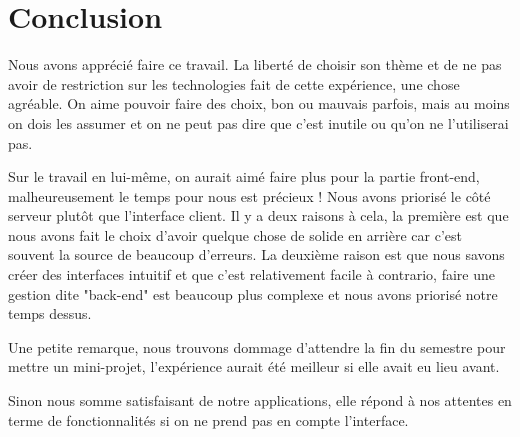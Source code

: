 
\section*{Conclusion}
Nous avons apprécié faire ce travail. La liberté de choisir son thème et de ne pas avoir de restriction sur les technologies fait de cette expérience, une chose agréable. On aime pouvoir faire des choix, bon ou mauvais parfois, mais au moins on dois les assumer et on ne peut pas dire que c'est inutile ou qu'on ne l'utiliserai pas.

Sur le travail en lui-même, on aurait aimé faire plus pour la partie front-end, malheureusement le temps pour nous est précieux ! Nous avons priorisé le côté serveur plutôt que l'interface client. Il y a deux raisons à cela, la première est que nous avons fait le choix d'avoir quelque chose de solide en arrière car c'est souvent la source de beaucoup d'erreurs. La deuxième raison est que nous savons créer des interfaces intuitif et que c'est relativement facile à contrario, faire une gestion dite "back-end" est beaucoup plus complexe et nous avons priorisé notre temps dessus.

Une petite remarque, nous trouvons dommage d'attendre la fin du semestre pour mettre un mini-projet, l'expérience aurait été meilleur si elle avait eu lieu avant.

Sinon nous somme satisfaisant de notre applications, elle répond à nos attentes en terme de fonctionnalités si on ne prend pas en compte l'interface.